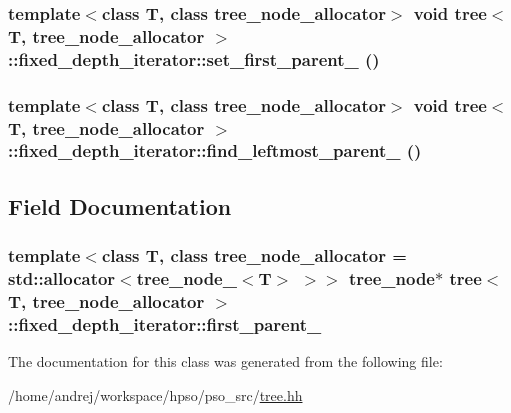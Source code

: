 \hypertarget{classtree_1_1fixed__depth__iterator_d4a7326054e3770ab7b2e98d70cbc31e}{
\subsubsection{\setlength{\rightskip}{0pt plus 5cm}template$<$class T, class tree\_\-node\_\-allocator$>$ void {\bf tree}$<$ T, tree\_\-node\_\-allocator $>$::fixed\_\-depth\_\-iterator::set\_\-first\_\-parent\_\- ()}}
\label{classtree_1_1fixed__depth__iterator_d4a7326054e3770ab7b2e98d70cbc31e}


\hypertarget{classtree_1_1fixed__depth__iterator_aa76856fbd25e52e8e0104ba744b0246}{
\subsubsection{\setlength{\rightskip}{0pt plus 5cm}template$<$class T, class tree\_\-node\_\-allocator$>$ void {\bf tree}$<$ T, tree\_\-node\_\-allocator $>$::fixed\_\-depth\_\-iterator::find\_\-leftmost\_\-parent\_\- ()}}
\label{classtree_1_1fixed__depth__iterator_aa76856fbd25e52e8e0104ba744b0246}




\subsection{Field Documentation}
\hypertarget{classtree_1_1fixed__depth__iterator_5f6c92f12c4281e94e950ccd70833985}{
\subsubsection{\setlength{\rightskip}{0pt plus 5cm}template$<$class T, class tree\_\-node\_\-allocator = std::allocator$<$tree\_\-node\_\-$<$T$>$ $>$$>$ {\bf tree\_\-node}$\ast$ {\bf tree}$<$ T, tree\_\-node\_\-allocator $>$::{\bf fixed\_\-depth\_\-iterator::first\_\-parent\_\-}}}
\label{classtree_1_1fixed__depth__iterator_5f6c92f12c4281e94e950ccd70833985}




The documentation for this class was generated from the following file:\begin{CompactItemize}
\item 
/home/andrej/workspace/hpso/pso\_\-src/\hyperlink{tree_8hh}{tree.hh}\end{CompactItemize}
